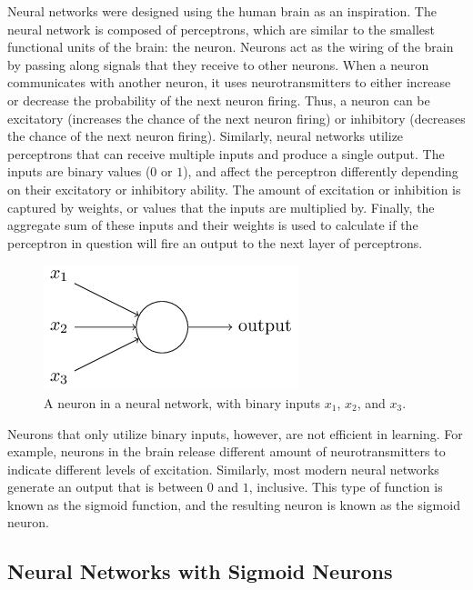 Neural networks were designed using the human brain as an inspiration.
The neural network is composed of perceptrons, which are similar to the smallest functional units of the brain: the neuron.
Neurons act as the wiring of the brain by passing along signals that they receive to other neurons.
When a neuron communicates with another neuron, it uses neurotransmitters to either increase or decrease the probability of the next neuron firing.
Thus, a neuron can be excitatory (increases the chance of the next neuron firing) or inhibitory (decreases the chance of the next neuron firing).
Similarly, neural networks utilize perceptrons that can receive multiple inputs and produce a single output.
The inputs are binary values ($0$ or $1$), and affect the perceptron differently depending on their excitatory or inhibitory ability.
The amount of excitation or inhibition is captured by weights, or values that the inputs are multiplied by.
Finally, the aggregate sum of these inputs and their weights is used to calculate if the perceptron in question will fire an output to the next layer of perceptrons. 

\begin{figure}[htbp!]
    \centering
    \includegraphics[scale=1.0]{pictures/NeuralNetworks/sigmoidNeuron.png}
        \caption{A neuron in a neural network, with binary inputs $x_1$, $x_2$, and $x_3$.}
    \label{fig:sigmoidNeuron}
\end{figure}

Neurons that only utilize binary inputs, however, are not efficient in learning.
For example, neurons in the brain release different amount of neurotransmitters to indicate different levels of excitation.
Similarly, most modern neural networks generate an output that is between $0$ and $1$, inclusive.
This type of function is known as the sigmoid function, and the resulting neuron is known as the sigmoid neuron. 

\subsection{Neural Networks with Sigmoid Neurons}

